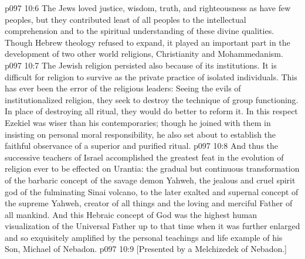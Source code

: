 \vs p097 10:6 The Jews loved justice, wisdom, truth, and righteousness as have few peoples, but they contributed least of all peoples to the intellectual comprehension and to the spiritual understanding of these divine qualities. Though Hebrew theology refused to expand, it played an important part in the development of two other world religions, Christianity and Mohammedanism.\plusone
\vs p097 10:7 The Jewish religion persisted also because of its institutions. It is difficult for religion to survive as the private practice of isolated individuals. This has ever been the error of the religious leaders: Seeing the evils of institutionalized religion, they seek to destroy the technique of group functioning. In place of destroying all ritual, they would do better to reform it. In this respect Ezekiel was wiser than his contemporaries; though he joined with them in insisting on personal moral responsibility, he also set about to establish the faithful observance of a superior and purified ritual.
\pc \vs p097 10:8 And thus the successive teachers of Israel accomplished the greatest feat in the evolution of religion ever to be effected on Urantia: the gradual but continuous transformation of the barbaric concept of the savage demon Yahweh, the jealous and cruel spirit god of the fulminating Sinai volcano, to the later exalted and supernal concept of the supreme Yahweh, creator of all things and the loving and merciful Father of all mankind. And this Hebraic concept of God was the highest human visualization of the Universal Father up to that time when it was further enlarged and so exquisitely amplified by the personal teachings and life example of his Son, Michael of Nebadon.\plusone
\vsetoff
\vs p097 10:9 [Presented by a Melchizedek of Nebadon.]
